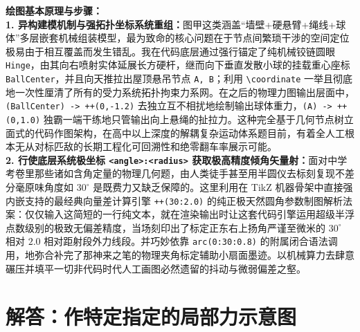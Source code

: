 \vspace{0.6cm}

{\small\color{blue!70!black}
\textbf{绘图基本原理与步骤：}\\
\textbf{1. 异构建模机制与强拓扑坐标系统重组：}图甲这类涵盖“墙壁+硬悬臂+绳线+球体”多层嵌套机械组装模型，最为致命的核心问题在于节点间繁琐干涉的空间定位极易由于相互覆盖而发生错乱。我在代码底层通过强行锚定了纯机械铰链圆眼 \texttt{Hinge}，由其向右喷射实体延展长方硬杆，继而向下垂直发散小球的挂载重心座标 \texttt{BallCenter}，并且向天推拉出屋顶悬吊节点 \texttt{A, B}；利用 \texttt{\textbackslash coordinate} 一举且彻底地一次性厘清了所有的受力系统拓扑拘束力系网。在之后的物理力图输出层面中，\texttt{(BallCenter) -> ++(0,-1.2)} 去独立互不相扰地绘制输出球体重力，\texttt{(A) -> ++(0,1.0)} 独霸一端干练地只管输出向上悬绳的扯拉力。这种完全基于几何节点树立面式的代码作图架构，在高中以上深度的解耦复杂运动体系题目前，有着全人工根本无从对标匹敌的长期工程化可回溯性和绝零翻车率展示可能。\\
\textbf{2. 行使底层系统极坐标 \texttt{<angle>:<radius>} 获取极高精度倾角矢量射：}面对中学考卷里那些诸如含角定量的物理几何题，由人类徒手甚至用半圆仪去标刻复现不差分毫原味角度如 $30^{\circ}$ 是既费力又缺乏保障的。这里利用在 TikZ 机器骨架中直接强内嵌支持的最经典向量差计算引擎 \texttt{++(30:2.0)} 的纯正极天然圆角参数制图解析法案：仅仅输入这简短的一行纯文本，就在渲染输出时让这套代码引擎运用超级半浮点数级别的极致无偏差精度，当场刻印出了标定正东右上扬角严谨至微米的 $30^{\circ}$ 相对 $2.0$ 相对距射段外力线段。并巧妙依靠 \texttt{arc(0:30:0.8)} 的附属闭合语法调用，地弥合补完了那神来之笔的物理夹角标定辅助小扇面墨迹。以机械算力去肆意碾压并填平一切非代码时代人工画图必然遗留的抖动与微弱偏差之壑。
}





\section{解答：作特定指定的局部力示意图}

\vspace{0.6cm}


